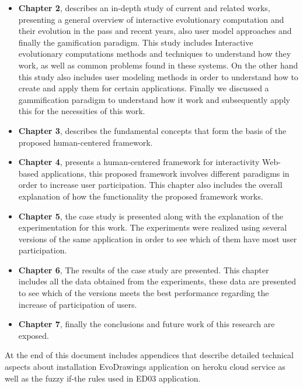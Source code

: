 \begin{itemize}
\item \textbf{Chapter 2}, describes an in-depth study of current and related
works, presenting a general overview of interactive evolutionary computation and
their evolution in the pass and recent years, also user model approaches and
finally the gamification paradigm. This study includes Interactive evolutionary
computations methods and techniques to understand how they work, as well as
common problems found in these systems. On the other hand this study also includes user
modeling methods in order to understand how to create and apply them for certain
applications. Finally we discussed a gammification paradigm to
understand how it work and subsequently apply this for the necessities of this
work.

\item \textbf{Chapter 3}, describes the fundamental
concepts that form the basis of the proposed human-centered framework.

\item \textbf{Chapter 4}, presents a human-centered framework for interactivity
Web-based applications, this proposed framework involves different paradigms in
order to increase user participation. This chapter also includes the overall
explanation of how the functionality the proposed framework works.

\item \textbf{Chapter 5}, the case study is presented along with the
explanation of the experimentation for this work. The experiments were realized
using several versions of the same application in order to see which of them
have most user participation.

\item \textbf{Chapter 6}, The results of the case study are presented. This
chapter includes all the data obtained from the experiments, these data are
presented to see which of the versions meets the best performance regarding the
increase of participation of users.

\item \textbf{Chapter 7}, finally the conclusions and future work of this
research are exposed.
\end{itemize}

At the end of this document  includes appendices that describe
detailed technical aspects about installation EvoDrawings application on heroku
cloud service as well as the fuzzy if-the rules used in ED03 application.
